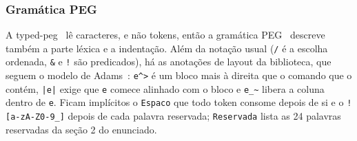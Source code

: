 \documentclass[12pt,a4paper]{article}
\begin{document}
\subsubsection*{Gramática PEG}

A typed-peg~\cite{typedpeg} lê caracteres, e não tokens, então a
gramática PEG~\cite{ford2004} descreve também a parte léxica e a
indentação. Além da notação usual (\texttt{/} é a escolha ordenada,
\texttt{\&} e \texttt{!} são predicados), há as anotações de layout da
biblioteca, que seguem o modelo de Adams~\cite{adams2013}:
\texttt{e\^{}>} é um bloco mais à direita que o comando que o contém,
\texttt{|e|} exige que \texttt{e} comece alinhado com o bloco e
\texttt{e\_\textasciitilde} libera a coluna dentro de \texttt{e}. Ficam
implícitos o \texttt{Espaco} que todo token consome depois de si e o
\texttt{![a-zA-Z0-9\_]} depois de cada palavra reservada;
\texttt{Reservada} lista as 24 palavras reservadas da seção 2 do
enunciado.
\end{document}
